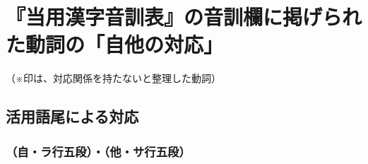 \chapter{『当用漢字音訓表』の音訓欄に掲げられた動詞の「自他の対応」}

\vspace{-2.5\zw}
\begin{flushright}
（※印は、対応関係を持たないと整理した動詞）\hspace*{1\zw}
\end{flushright}

\section[活用語尾による対応]{活用語尾による対応}

\subsection{（自・ラ行五段）・（他・サ行五段）}

